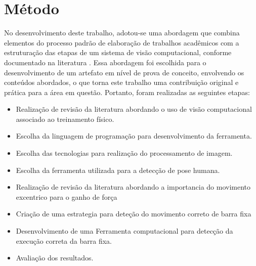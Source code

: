 \section[Método]{Método}\label{sec:Metodo}


No desenvolvimento deste trabalho, adotou-se uma abordagem que combina elementos do processo padrão de elaboração de trabalhos acadêmicos com a estruturação das etapas de um sistema de visão computacional, conforme documentado na literatura \cite{imagemMonocromatica}.  Essa abordagem foi escolhida para o desenvolvimento de um artefato em nível de prova de conceito, envolvendo os conteúdos abordados, o que torna este trabalho uma contribuição original e prática para a área em questão. Portanto, foram realizadas as seguintes etapas:


 \begin{itemize}
   \item Realização de revisão da literatura abordando o uso de visão computacional associado ao treinamento físico.
   \item Escolha da linguagem de programação para desenvolvimento da ferramenta.
   \item Escolha das tecnologias para realização do processamento de imagem.
   \item Escolha da ferramenta utilizada para a detecção de pose humana.  
   \item Realização de revisão da literatura abordando a importancia do movimento excentrico para o ganho de força
   \item Criação de uma estrategia para deteção do movimento correto de barra fixa    
   \item Desenvolvimento de uma Ferramenta computacional para detecção da execução correta da barra fixa.
   \item Avaliação dos resultados.
   
 \end{itemize}

